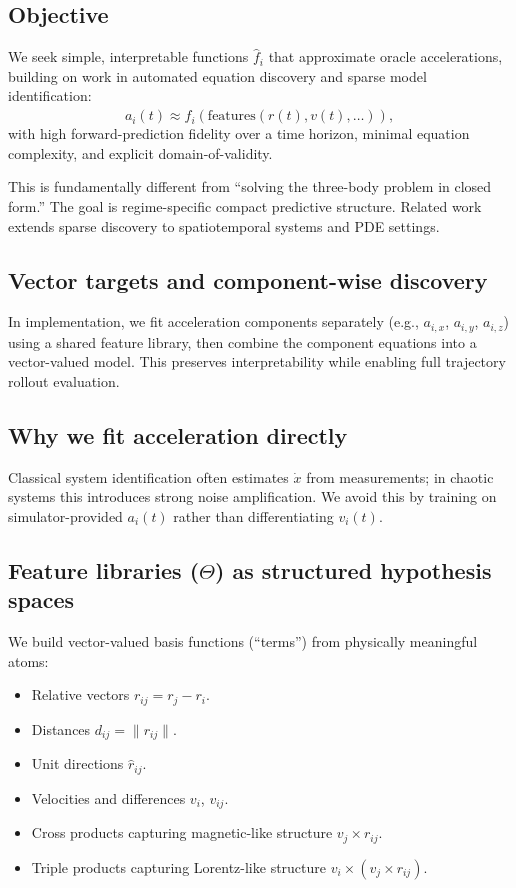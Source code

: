 \documentclass[11pt]{article}
\begin{document}
\subsection{Objective}
We seek simple, interpretable functions $\hat{f}_i$ that approximate oracle accelerations, building on work in automated equation discovery and sparse model identification\cite{Bongard2007,Schmidt2009,Brunton2016}:
\begin{equation*}
a_i(t) \approx \hat{f}_i\left(\text{features}(r(t), v(t), \ldots)\right),
\end{equation*}
with high forward-prediction fidelity over a time horizon, minimal equation complexity, and explicit domain-of-validity.

This is fundamentally different from ``solving the three-body problem in closed form.'' The goal is regime-specific compact predictive structure. Related work extends sparse discovery to spatiotemporal systems and PDE settings.\cite{Rudy2017}

\subsection{Vector targets and component-wise discovery}
In implementation, we fit acceleration components separately (e.g., $a_{i,x}$, $a_{i,y}$, $a_{i,z}$) using a shared feature library, then combine the component equations into a vector-valued model. This preserves interpretability while enabling full trajectory rollout evaluation.

\subsection{Why we fit acceleration directly}
Classical system identification often estimates $\dot{x}$ from measurements; in chaotic systems this introduces strong noise amplification. We avoid this by training on simulator-provided $a_i(t)$ rather than differentiating $v_i(t)$.

\subsection{Feature libraries ($\Theta$) as structured hypothesis spaces}
We build vector-valued basis functions (``terms'') from physically meaningful atoms:
\begin{itemize}
\item Relative vectors $r_{ij} = r_j - r_i$.
\item Distances $d_{ij} = \|r_{ij}\|$.
\item Unit directions $\hat{r}_{ij}$.
\item Velocities and differences $v_i$, $v_{ij}$.
\item Cross products capturing magnetic-like structure $v_j \times r_{ij}$.
\item Triple products capturing Lorentz-like structure $v_i \times (v_j \times r_{ij})$.
\end{itemize}
\end{document}
